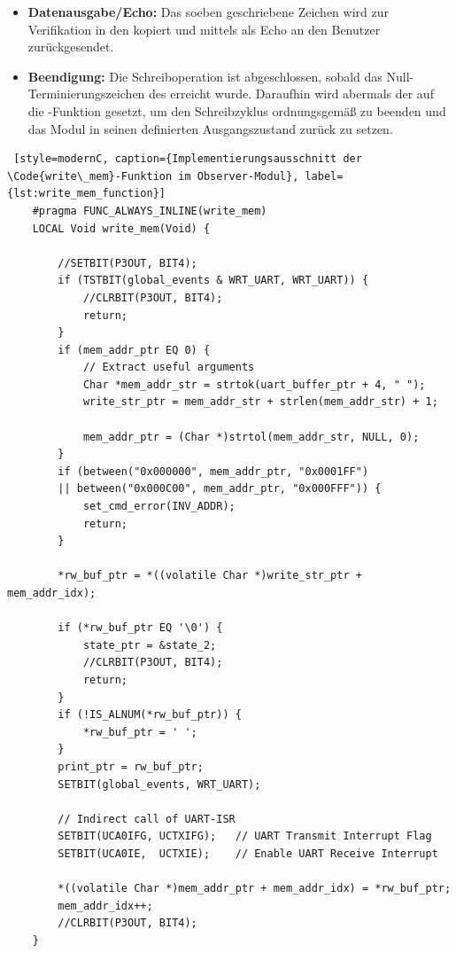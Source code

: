\begin{itemize}
	\item \textbf{Datenausgabe/Echo:} Das soeben geschriebene Zeichen wird zur Verifikation in den  kopiert und mittels  als Echo an den Benutzer zur\"uckgesendet.
	
	\item \textbf{Beendigung:} Die Schreiboperation ist abgeschlossen, sobald das Null-Termi\-nierungszeichen des  erreicht wurde. Daraufhin wird abermals der  auf die -Funktion gesetzt, um den Schreibzyklus ordnungsgem\"a{\ss} zu beenden und das Modul in seinen definierten Ausgangszustand zur\"uck zu setzen.
\end{itemize}


\vspace{0.5cm}
\begin{lstlisting} [style=modernC, caption={Implementierungsausschnitt der \Code{write\_mem}-Funktion im Observer-Modul}, label={lst:write_mem_function}]
	#pragma FUNC_ALWAYS_INLINE(write_mem)
	LOCAL Void write_mem(Void) {
		
		//SETBIT(P3OUT, BIT4);
		if (TSTBIT(global_events & WRT_UART, WRT_UART)) {
			//CLRBIT(P3OUT, BIT4);
			return;
		}
		if (mem_addr_ptr EQ 0) {
			// Extract useful arguments
			Char *mem_addr_str = strtok(uart_buffer_ptr + 4, " ");
			write_str_ptr = mem_addr_str + strlen(mem_addr_str) + 1;
			
			mem_addr_ptr = (Char *)strtol(mem_addr_str, NULL, 0);
		}
		if (between("0x000000", mem_addr_ptr, "0x0001FF")
		|| between("0x000C00", mem_addr_ptr, "0x000FFF")) {
			set_cmd_error(INV_ADDR);
			return;
		}
		
		*rw_buf_ptr = *((volatile Char *)write_str_ptr + mem_addr_idx);
		
		if (*rw_buf_ptr EQ '\0') {
			state_ptr = &state_2;
			//CLRBIT(P3OUT, BIT4);
			return;
		}
		if (!IS_ALNUM(*rw_buf_ptr)) {
			*rw_buf_ptr = ' ';
		}
		print_ptr = rw_buf_ptr;
		SETBIT(global_events, WRT_UART);
		
		// Indirect call of UART-ISR
		SETBIT(UCA0IFG, UCTXIFG);   // UART Transmit Interrupt Flag
		SETBIT(UCA0IE,  UCTXIE);    // Enable UART Receive Interrupt
		
		*((volatile Char *)mem_addr_ptr + mem_addr_idx) = *rw_buf_ptr;
		mem_addr_idx++;
		//CLRBIT(P3OUT, BIT4);
	}
\end{lstlisting}

